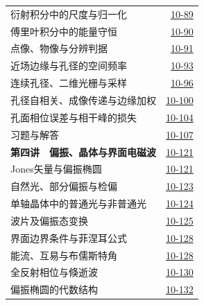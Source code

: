 \begin{longtable}{@{}p{}r@{}}
\hspace{1em}衍射积分中的尺度与归一化&\href{course-page:10:93}{10-89}\\[2pt]
\hspace{1em}傅里叶积分中的能量守恒&\href{course-page:10:94}{10-90}\\[2pt]
\hspace{1em}点像、物像与分辨判据&\href{course-page:10:95}{10-91}\\[2pt]
\hspace{1em}近场边缘与孔径的空间频率&\href{course-page:10:97}{10-93}\\[2pt]
\hspace{1em}连续孔径、二维光栅与采样&\href{course-page:10:100}{10-96}\\[2pt]
\hspace{1em}孔径自相关、成像传递与边缘加权&\href{course-page:10:104}{10-100}\\[2pt]
\hspace{1em}孔面相位误差与相干峰的损失&\href{course-page:10:108}{10-104}\\[2pt]
\hspace{1em}习题与解答&\href{course-page:10:111}{10-107}\\[2pt]
\textbf{第四讲　偏振、晶体与界面电磁波}&\href{course-page:10:125}{10-121}\\[2pt]
\hspace{1em}Jones矢量与偏振椭圆&\href{course-page:10:125}{10-121}\\[2pt]
\hspace{1em}自然光、部分偏振与检偏&\href{course-page:10:127}{10-123}\\[2pt]
\hspace{1em}单轴晶体中的普通光与非普通光&\href{course-page:10:128}{10-124}\\[2pt]
\hspace{1em}波片及偏振态变换&\href{course-page:10:129}{10-125}\\[2pt]
\hspace{1em}界面边界条件与菲涅耳公式&\href{course-page:10:132}{10-128}\\[2pt]
\hspace{1em}能流、互易与布儒斯特角&\href{course-page:10:132}{10-128}\\[2pt]
\hspace{1em}全反射相位与倏逝波&\href{course-page:10:134}{10-130}\\[2pt]
\hspace{1em}偏振椭圆的代数结构&\href{course-page:10:136}{10-132}\\[2pt]

\end{longtable}
